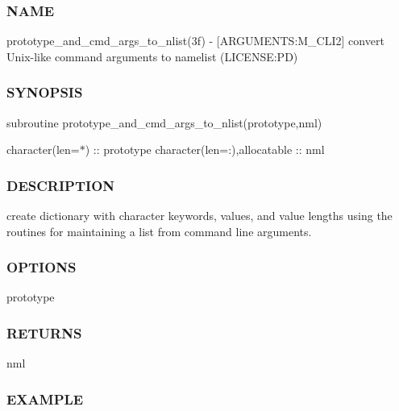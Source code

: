 \subsubsection*{N\+A\+ME}

prototype\+\_\+and\+\_\+cmd\+\_\+args\+\_\+to\+\_\+nlist(3f) -\/ \mbox{[}A\+R\+G\+U\+M\+E\+N\+TS\+:M\+\_\+\+C\+L\+I2\mbox{]} convert Unix-\/like command arguments to namelist (L\+I\+C\+E\+N\+SE\+:PD) \subsubsection*{S\+Y\+N\+O\+P\+S\+IS}

subroutine prototype\+\_\+and\+\_\+cmd\+\_\+args\+\_\+to\+\_\+nlist(prototype,nml)

character(len=$\ast$) \+:\+: prototype character(len=\+:),allocatable \+:\+: nml \subsubsection*{D\+E\+S\+C\+R\+I\+P\+T\+I\+ON}

create dictionary with character keywords, values, and value lengths using the routines for maintaining a list from command line arguments. \subsubsection*{O\+P\+T\+I\+O\+NS}

prototype \subsubsection*{R\+E\+T\+U\+R\+NS}

nml \subsubsection*{E\+X\+A\+M\+P\+LE}

